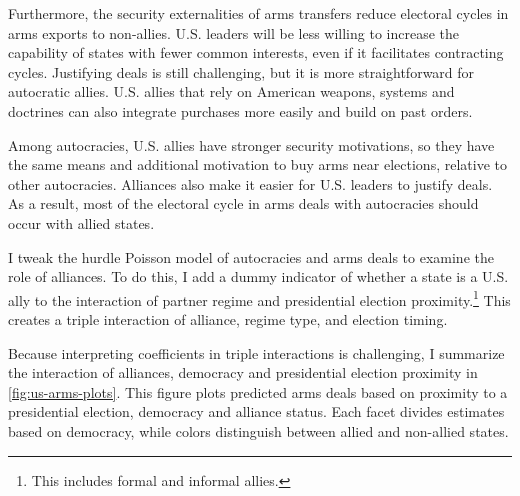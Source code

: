 \documentclass[12pt]{article}
\begin{document}
Furthermore, the security externalities of arms transfers reduce electoral cycles in arms exports to non-allies. 
U.S. leaders will be less willing to increase the capability of states with fewer common interests, even if it facilitates contracting cycles.
Justifying deals is still challenging, but it is more straightforward for autocratic allies. 
U.S. allies that rely on American weapons, systems and doctrines can also integrate purchases more easily and build on past orders. 






Among autocracies, U.S. allies have stronger security motivations, so they have the same means and additional motivation to buy arms near elections, relative to other autocracies. 
Alliances also make it easier for U.S. leaders to justify deals.
As a result, most of the electoral cycle in arms deals with autocracies should occur with allied states. 


I tweak the hurdle Poisson model of autocracies and arms deals to examine the role of alliances. 
To do this, I add a dummy indicator of whether a state is a U.S. ally to the interaction of partner regime and presidential election proximity.\footnote{This includes formal and informal allies.}
This creates a triple interaction of alliance, regime type, and election timing. 


Because interpreting coefficients in triple interactions is challenging, I summarize the interaction of alliances, democracy and presidential election proximity in \autoref{fig:us-arms-plots}.
This figure plots predicted arms deals based on proximity to a presidential election, democracy and alliance status. 
Each facet divides estimates based on democracy, while colors distinguish between allied and non-allied states. 
\end{document}
